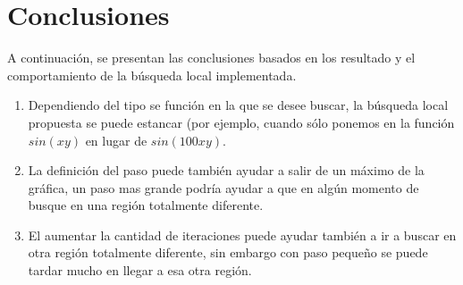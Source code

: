 \documentclass{article}
\begin{document}
\section{Conclusiones}
A continuación, se presentan las conclusiones basados en los resultado y el comportamiento de la búsqueda local implementada.
\begin{enumerate}
\item Dependiendo del tipo se función en la que se desee buscar, la búsqueda local propuesta se puede estancar (por ejemplo, cuando sólo ponemos en la función $sin(xy)$ en lugar de $sin(100xy)$.
\item La definición del paso puede también ayudar a salir de un máximo de la gráfica, un paso mas grande podría ayudar a que en algún momento de busque en una región totalmente diferente.
\item El aumentar la cantidad de iteraciones puede ayudar también a ir a buscar en otra región totalmente diferente, sin embargo con paso pequeño se puede tardar mucho en llegar a esa otra región.
\end{enumerate}



\end{document}
